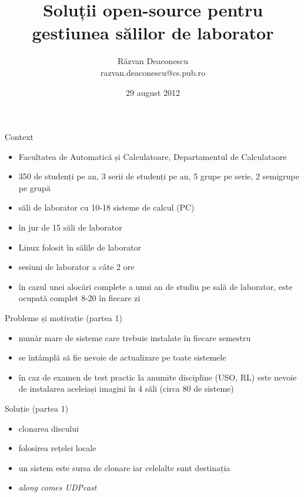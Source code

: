 \documentclass{beamer}
\title[Gestiunea laboratorului]{Soluții open-source pentru gestiunea sălilor
de laborator}
\institute{Informatica la Castel}
\author[Răzvan Deaconescu]{Răzvan Deaconescu \\
razvan.deaconescu@cs.pub.ro}
\date{29 august 2012}
\begin{document}
\frame{\titlepage}

\begin{frame}{Context}
  \begin{itemize}
    \item Facultatea de Automatică și Calculatoare, Departamentul de
      Calculataore
    \item 350 de studenți pe an, 3 serii de studenți pe an, 5 grupe pe serie,
      2 semigrupe pe grupă
    \item săli de laborator cu 10-18 sisteme de calcul (PC)
    \item în jur de 15 săli de laborator
    \item Linux folosit în sălile de laborator
    \item sesiuni de laborator a câte 2 ore
    \item în cazul unei alocări complete a unui an de studiu pe sală de
      laborator, este ocupată complet 8-20 în fiecare zi
  \end{itemize}
\end{frame}

\begin{frame}{Probleme și motivație (partea 1)}
  \begin{itemize}
    \item număr mare de sisteme care trebuie instalate în fiecare semestru
    \item se întâmplă să fie nevoie de actualizare pe toate sistemele
    \item în caz de examen de test practic la anumite discipline (USO, RL)
      este nevoie de instalarea aceleiași imagini în 4 săli (circa 80 de
      sisteme)
  \end{itemize}
\end{frame}

\begin{frame}{Soluție (partea 1)}
  \begin{itemize}
    \item clonarea discului
    \item folosirea rețelei locale
    \item un sistem este sursa de clonare iar celelalte sunt destinația
    \item \textit{along comes UDPcast}
  \end{itemize}
\end{frame}
\end{document}
